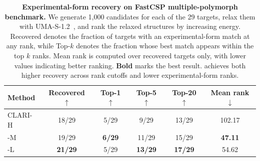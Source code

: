 
\begin{table}[t]
\centering
\caption{\textbf{Experimental-form recovery on FastCSP multiple-polymorph benchmark.}
We generate 1{,}000 candidates for each of the 29 targets, relax them with
UMA-S-1.2~\citep{wood2025family}, and rank the relaxed structures by increasing
energy. Recovered denotes the fraction of targets with an
experimental-form match at any rank, while Top-$k$ denotes the fraction whose
best match appears within the top $k$ ranks. Mean rank is computed over recovered
targets only, with lower values indicating better ranking. \textbf{Bold} marks
the best result. \model{} achieves both higher recovery across rank cutoffs and
lower experimental-form ranks.}
\label{tab:fastcsp-multi-ranking}
\begin{tabular}{lccccc}
\toprule
Method & Recovered $\uparrow$ & Top-1 $\uparrow$ & Top-5 $\uparrow$
& Top-20 $\uparrow$ & Mean rank $\downarrow$ \\
\midrule
CLARI-H & 18/29 & 5/29 & 9/29 & 13/29 & 102.17 \\
\rowcolor{mfTealFill}
\model{}-M & 19/29 & \textbf{6/29} & 11/29 & 15/29 & \textbf{47.11} \\
\rowcolor{mfTealFill}
\model{}-L & \textbf{21/29} & 5/29 & \textbf{13/29} & \textbf{17/29} & 54.62 \\
\bottomrule
\end{tabular}
\end{table}
